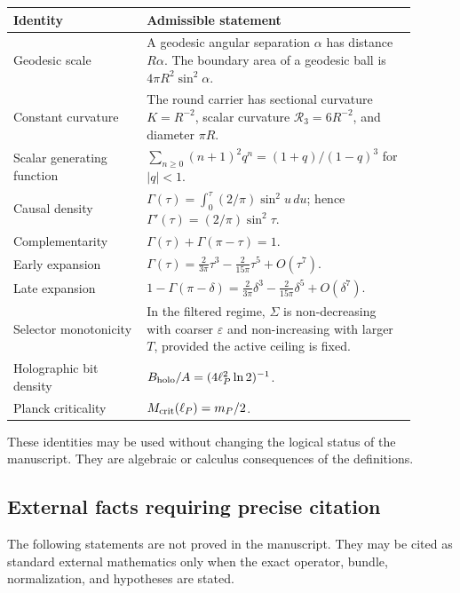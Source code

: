 \documentclass[11pt,a4paper]{article}
\begin{document}
\begin{center}
\small
\begin{tabular}{p{0.30\linewidth}p{0.60\linewidth}}
\toprule
Identity & Admissible statement\\
\midrule
Geodesic scale & A geodesic angular separation \(\alpha\) has distance \(R\alpha\).  The boundary area of a geodesic ball is \(4\pi R^2\sin^2\alpha\).\\
Constant curvature & The round carrier has sectional curvature \(K=R^{-2}\), scalar curvature \(\mathcal R_3=6R^{-2}\), and diameter \(\pi R\).\\
Scalar generating function & \(\sum_{n\ge0}(n+1)^2q^n=(1+q)/(1-q)^3\) for \(|q|<1\).\\
Causal density & \(\Gamma(\tau)=\int_0^\tau(2/\pi)\sin^2u\,du\); hence \(\Gamma'(\tau)=(2/\pi)\sin^2\tau\).\\
Complementarity & \(\Gamma(\tau)+\Gamma(\pi-\tau)=1\).\\
Early expansion & \(\Gamma(\tau)=\frac{2}{3\pi}\tau^3-\frac{2}{15\pi}\tau^5+O(\tau^7)\).\\
Late expansion & \(1-\Gamma(\pi-\delta)=\frac{2}{3\pi}\delta^3-\frac{2}{15\pi}\delta^5+O(\delta^7)\).\\
Selector monotonicity & In the filtered regime, \(\Sigma\) is non-decreasing with coarser \(\varepsilon\) and non-increasing with larger \(T\), provided the active ceiling is fixed.\\
Holographic bit density & \(B_{\rm holo}/A=(4\ell_P^2\ln2)^{-1}\).\\
Planck criticality & \(M_{\rm crit}(\ell_P)=m_P/2\).\\
\bottomrule
\end{tabular}
\end{center}

These identities may be used without changing the logical status of the manuscript.  They are algebraic or calculus consequences of the definitions.

\subsection{External facts requiring precise citation}

The following statements are not proved in the manuscript.  They may be cited as standard external mathematics only when the exact operator, bundle, normalization, and hypotheses are stated.
\end{document}

